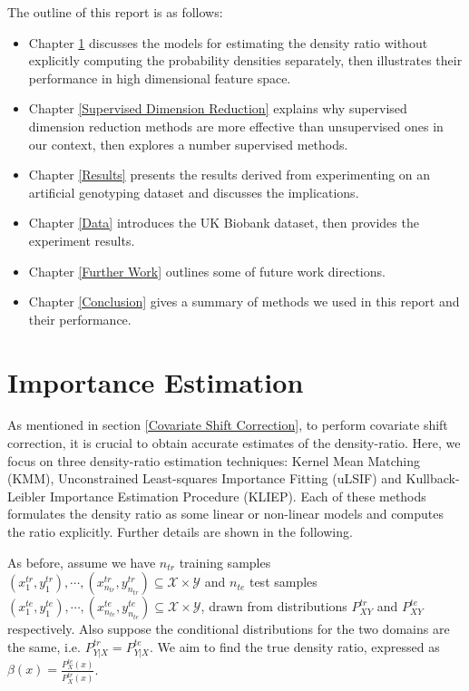 \documentclass[a4paper,12pt]{article}
\begin{document}
The outline of this report is as follows:
\begin{itemize}
	\item Chapter \ref{Importance Estimation} discusses the models for estimating the density ratio without explicitly computing the probability densities separately, then illustrates their performance in high dimensional feature space.
	\item Chapter \ref{Supervised Dimension Reduction} explains why supervised dimension reduction methods are more effective than unsupervised ones in our context, then explores a number supervised methods.
	\item Chapter \ref{Results} presents the results derived from experimenting on an artificial genotyping dataset and discusses the implications.
	\item Chapter \ref{Data} introduces the UK Biobank dataset, then provides the experiment results.
	\item Chapter \ref{Further Work} outlines some of future work directions.
	\item Chapter \ref{Conclusion} gives a summary of methods we used in this report and their performance.
\end{itemize}

\pagebreak
%
%
%
%
%
%
\section{Importance Estimation} \label{Importance Estimation}
As mentioned in section \ref{Covariate Shift Correction}, to perform covariate shift correction, it is crucial to obtain accurate estimates of the density-ratio. Here, we focus on three density-ratio estimation techniques: Kernel Mean Matching (KMM), Unconstrained Least-squares Importance Fitting (uLSIF) and Kullback-Leibler Importance Estimation Procedure (KLIEP). Each of these methods formulates the density ratio as some linear or non-linear models and computes the ratio explicitly. Further details are shown in the following.

As before, assume we have $n_{tr}$ training samples $(x_{1}^{tr},y_{1}^{tr}), \cdots, (x_{n_{tr}}^{tr},y_{n_{tr}}^{tr}) \subseteq \mathcal{X} \times \mathcal{Y}$ and $n_{te}$ test samples $(x_{1}^{te},y_{1}^{te}), \cdots, (x_{n_{te}}^{te},y_{n_{te}}^{te}) \subseteq \mathcal{X} \times \mathcal{Y}$, drawn from distributions $P_{XY}^{tr}$ and $P_{XY}^{te}$ respectively. Also suppose the conditional distributions for the two domains are the same, i.e.  $P_{Y|X}^{tr} = P_{Y|X}^{te}$. We aim to find the true density ratio, expressed as $\beta(x) =  \frac{P^{te}_{X}(x)}{P^{tr}_{X}(x)}$.
\end{document}
